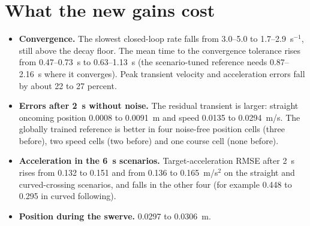\documentclass[11pt]{article}
\begin{document}
\section{What the new gains cost}
\begin{itemize}
\item \textbf{Convergence.} The slowest closed-loop rate falls from
3.0--5.0 to 1.7--2.9~s$^{-1}$, still above the decay floor. The mean time to
the convergence tolerance rises from 0.47--0.73~s to 0.63--1.13~s (the
scenario-tuned reference needs 0.87--2.16~s where it converges). Peak
transient velocity and acceleration errors fall by about 22 to 27 percent.
\item \textbf{Errors after 2~s without noise.} The residual transient is
larger: straight oncoming position 0.0008 to 0.0091~m and speed 0.0135 to
0.0294~m/s. The globally trained reference is better in four noise-free
position cells (three before), two speed cells (two before) and one course
cell (none before).
\item \textbf{Acceleration in the 6~s scenarios.} Target-acceleration RMSE
after 2~s rises from 0.132 to 0.151 and from 0.136 to 0.165~m/s$^2$ on the
straight and curved-crossing scenarios, and falls in the other four
(for example 0.448 to 0.295 in curved following).
\item \textbf{Position during the swerve.} 0.0297 to 0.0306~m.
\end{itemize}
\end{document}
